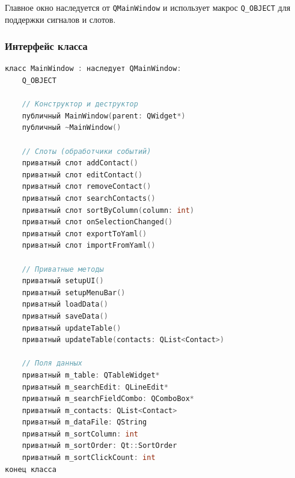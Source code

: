 Главное окно наследуется от \texttt{QMainWindow} и использует макрос \texttt{Q\_OBJECT} для поддержки сигналов и слотов.

\subsubsection*{Интерфейс класса}

\begin{lstlisting}[language=C, caption=Заголовочный файл mainwindow.h]
класс MainWindow : наследует QMainWindow:
    Q_OBJECT
    
    // Конструктор и деструктор
    публичный MainWindow(parent: QWidget*)
    публичный ~MainWindow()

    // Слоты (обработчики событий)
    приватный слот addContact()
    приватный слот editContact()
    приватный слот removeContact()
    приватный слот searchContacts()
    приватный слот sortByColumn(column: int)
    приватный слот onSelectionChanged()
    приватный слот exportToYaml()
    приватный слот importFromYaml()

    // Приватные методы
    приватный setupUI()
    приватный setupMenuBar()
    приватный loadData()
    приватный saveData()
    приватный updateTable()
    приватный updateTable(contacts: QList<Contact>)

    // Поля данных
    приватный m_table: QTableWidget*
    приватный m_searchEdit: QLineEdit*
    приватный m_searchFieldCombo: QComboBox*
    приватный m_contacts: QList<Contact>
    приватный m_dataFile: QString
    приватный m_sortColumn: int
    приватный m_sortOrder: Qt::SortOrder
    приватный m_sortClickCount: int
конец класса
\end{lstlisting}

